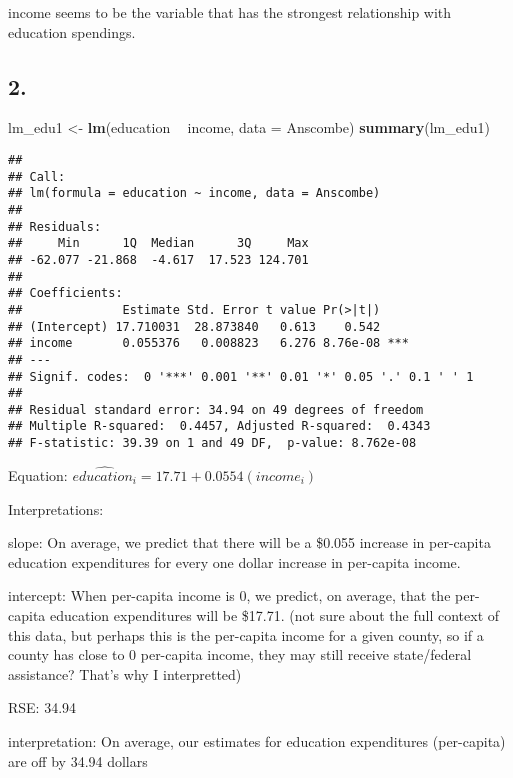 \documentclass[
]{article}
\newenvironment{Shaded}{\begin{snugshade}}{\end{snugshade}}
\newcommand{\DataTypeTok}[1]{\textcolor[rgb]{0.13,0.29,0.53}{#1}}
\newcommand{\KeywordTok}[1]{\textcolor[rgb]{0.13,0.29,0.53}{\textbf{#1}}}
\newcommand{\NormalTok}[1]{#1}
\newcommand{\OperatorTok}[1]{\textcolor[rgb]{0.81,0.36,0.00}{\textbf{#1}}}
\newcommand{\StringTok}[1]{\textcolor[rgb]{0.31,0.60,0.02}{#1}}
\begin{document}
income seems to be the variable that has the strongest relationship with
education spendings.

\hypertarget{section-1}{%
\subsection{2.}\label{section-1}}

\begin{Shaded}
\begin{Highlighting}[]
\NormalTok{lm_edu1 <-}\StringTok{ }\KeywordTok{lm}\NormalTok{(education }\OperatorTok{~}\StringTok{ }\NormalTok{income, }\DataTypeTok{data =}\NormalTok{ Anscombe)}
\KeywordTok{summary}\NormalTok{(lm_edu1)}
\end{Highlighting}
\end{Shaded}

\begin{verbatim}
## 
## Call:
## lm(formula = education ~ income, data = Anscombe)
## 
## Residuals:
##     Min      1Q  Median      3Q     Max 
## -62.077 -21.868  -4.617  17.523 124.701 
## 
## Coefficients:
##              Estimate Std. Error t value Pr(>|t|)    
## (Intercept) 17.710031  28.873840   0.613    0.542    
## income       0.055376   0.008823   6.276 8.76e-08 ***
## ---
## Signif. codes:  0 '***' 0.001 '**' 0.01 '*' 0.05 '.' 0.1 ' ' 1
## 
## Residual standard error: 34.94 on 49 degrees of freedom
## Multiple R-squared:  0.4457, Adjusted R-squared:  0.4343 
## F-statistic: 39.39 on 1 and 49 DF,  p-value: 8.762e-08
\end{verbatim}

Equation: \(\hat{education_i} = 17.71 + 0.0554(income_i)\)

Interpretations:

slope: On average, we predict that there will be a \$0.055 increase in
per-capita education expenditures for every one dollar increase in
per-capita income.

intercept: When per-capita income is 0, we predict, on average, that the
per-capita education expenditures will be \$17.71. (not sure about the
full context of this data, but perhaps this is the per-capita income for
a given county, so if a county has close to 0 per-capita income, they
may still receive state/federal assistance? That's why I interpretted)

RSE: 34.94

interpretation: On average, our estimates for education expenditures
(per-capita) are off by 34.94 dollars
\end{document}

